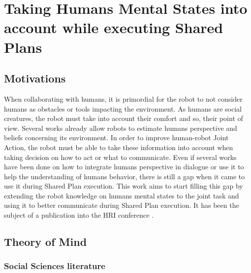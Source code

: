 \documentclass[english,a4paper,11pt,twoside]{StyleThese}
\begin{document}
\setcounter{chapter}{2} %
\dominitoc
\faketableofcontents
\fi

\chapter{Taking Humans Mental States into account while executing Shared Plans}
\minitoc

\label{ch:MS}

\section{Motivations}

When collaborating with humans, it is primordial for the robot to not consider humans as obstacles or tools impacting the environment. As humans are social creatures, the robot must take into account their comfort and so, their point of view. Several works already allow robots to estimate humans perspective and beliefs concerning its environment. In order to improve human-robot Joint Action, the robot must be able to take these information into account when taking decision on how to act or what to communicate. Even if several works have been done on how to integrate humans perspective in dialogue or use it to help the understanding of humans behavior, there is still a gap when it came to use it during Shared Plan execution. This work aims to start filling this gap by extending the robot knowledge on humans mental states to the joint task and using it to better communicate during Shared Plan execution. It has been the subject of a publication into the HRI conference \cite{devin2016implemented}.

\section{Theory of Mind}

\subsection{Social Sciences literature}
\end{document}
